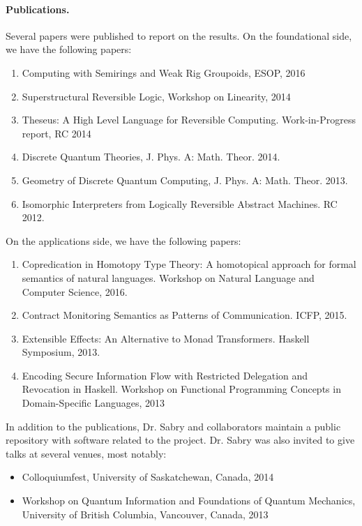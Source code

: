 \documentclass{article}
\theoremstyle{remark}
\begin{document}
\paragraph*{Publications.} Several papers were published to report on
the results. On the foundational side, we have the following papers:
\begin{enumerate}
\item Computing with Semirings and Weak Rig Groupoids, ESOP, 2016
\item Superstructural Reversible Logic, Workshop on Linearity, 2014
\item Theseus: A High Level Language for Reversible
  Computing. Work-in-Progress report, RC 2014
\item Discrete Quantum Theories, J. Phys. A: Math. Theor. 2014.
\item Geometry of Discrete Quantum Computing, J. Phys. A:
  Math. Theor. 2013.
\item Isomorphic Interpreters from Logically Reversible Abstract
  Machines. RC 2012. 
\end{enumerate}
On the applications side, we have the following papers: 
\begin{enumerate}
\item Copredication in Homotopy Type Theory: A homotopical approach
  for formal semantics of natural languages. Workshop on Natural
  Language and Computer Science, 2016.
\item Contract Monitoring Semantics as Patterns of
  Communication. ICFP, 2015.
\item Extensible Effects: An Alternative to Monad
  Transformers. Haskell Symposium, 2013.
\item Encoding Secure Information Flow with Restricted Delegation and
  Revocation in Haskell. Workshop on Functional Programming Concepts
  in Domain-Specific Languages, 2013
\end{enumerate}
In addition to the publications, Dr. Sabry and collaborators maintain
a public repository with software related to the project. Dr. Sabry
was also invited to give talks at several venues, most notably:
\begin{itemize}
\item Colloquiumfest, University of Saskatchewan, Canada, 2014
\item Workshop on Quantum Information and Foundations of Quantum
  Mechanics, University of British Columbia, Vancouver, Canada, 2013
\end{itemize}



\newpage
\printbibliography
\end{document}
